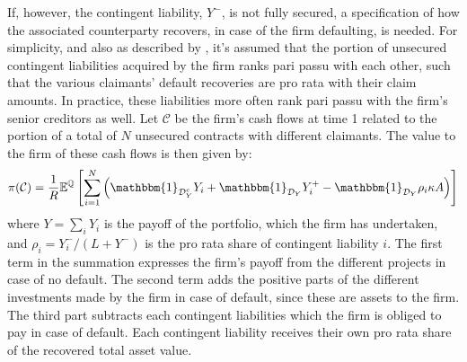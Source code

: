 \documentclass[../main.tex]{subfiles}
\begin{document}
        If, however, the contingent liability, $Y^{-}$, is not fully secured, a specification of how the associated counterparty recovers, in case of the firm defaulting, is needed.
        For simplicity, and also as described by \textcite{ADS2019}, it's assumed that the portion of unsecured contingent liabilities acquired by the firm ranks pari passu with each other, such that the various claimants' default recoveries are pro rata with their claim amounts.
        In practice, these liabilities more often rank pari passu with the firm's senior creditors as well.
        Let $\mathcal{C}$ be the firm's cash flows at time 1 related to the portion of a total of $N$ unsecured contracts with different claimants. The value to the firm of these cash flows is then given by:
        \begin{equation} %
            \pi(\mathcal{C}) = \discountfactor \mathbb{E}^{\mathbb{Q}}\left[
            \sum_{i=1}^{N} \left(
                \mathbbm{1}_{\mathcal{D}_{Y}^{c}}Y_{i}
                + \mathbbm{1}_{\mathcal{D}_{Y}} Y_{i}^{+}
                - \mathbbm{1}_{\mathcal{D}_{Y}} \rho_{i} \kappa A
            \right)\right]
        \end{equation}
        where $Y = \sum_{i} Y_{i}$ is the payoff of the portfolio, which the firm has undertaken, and $\rho_{i} = Y_{i}^{-}/(L + Y^{-})$ is the pro rata share of contingent liability $i$. The first term in the summation expresses the firm's payoff from the different projects in case of no default. The second term adds the positive parts of the different investments made by the firm in case of default, since these are assets to the firm. The third part subtracts each contingent liabilities which the firm is obliged to pay in case of default. Each contingent liability receives their own pro rata share of the recovered total asset value.
\end{document}
